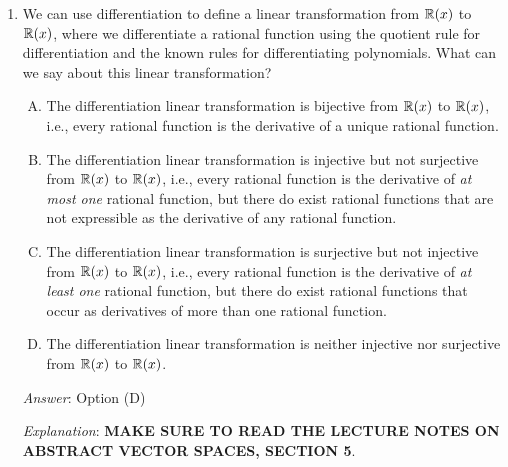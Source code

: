 \documentclass[10pt]{amsart}
\begin{document}
\begin{enumerate}
  {\em Answer}: Option (E)

  {\em Explanation}: {\bf MAKE SURE TO READ THE LECTURE NOTES ON
    ABSTRACT VECTOR SPACES, SECTION 5}.

  The only functions that differentiate to the zero
  function are the constant functions, so the kernel is $P_0$. The
  image is all of $\R[x]$, because every polynomial arises as the
  derivative of some polynomial.

  {\em Performance review}: 9 out of 22 people got this. 9 chose (B),
  2 chose (D), 1 chose (A), 1 left the question blank.

  {\em Historical note (last time)}: $9$ out of $26$ got this. $8$ chose (B),
  $7$ chose (D), $2$ chose (C).


\item We can use differentiation to define a linear transformation
  from $\mathbb{R}(x)$ to $\mathbb{R}(x)$, where we differentiate a rational function
  using the quotient rule for differentiation and the known rules for
  differentiating polynomials. What can we say about this linear
  transformation?

  \begin{enumerate}[(A)]
  \item The differentiation linear transformation is bijective from
    $\mathbb{R}(x)$ to $\mathbb{R}(x)$, i.e., every rational function is the
    derivative of a unique rational function.
  \item The differentiation linear transformation is injective but not
    surjective from $\mathbb{R}(x)$ to $\mathbb{R}(x)$, i.e., every rational function
    is the derivative of {\em at most one} rational function, but
    there do exist rational functions that are not expressible as the
    derivative of any rational function.
  \item The differentiation linear transformation is surjective but
    not injective from $\mathbb{R}(x)$ to $\mathbb{R}(x)$, i.e., every rational
    function is the derivative of {\em at least one} rational
    function, but there do exist rational functions that occur as
    derivatives of more than one rational function.
  \item The differentiation linear transformation is neither injective
    nor surjective from $\mathbb{R}(x)$ to $\mathbb{R}(x)$.
  \end{enumerate}

  {\em Answer}: Option (D)

  {\em Explanation}: {\bf MAKE SURE TO READ THE LECTURE NOTES ON
    ABSTRACT VECTOR SPACES, SECTION 5}.


\end{enumerate}
\end{document}
